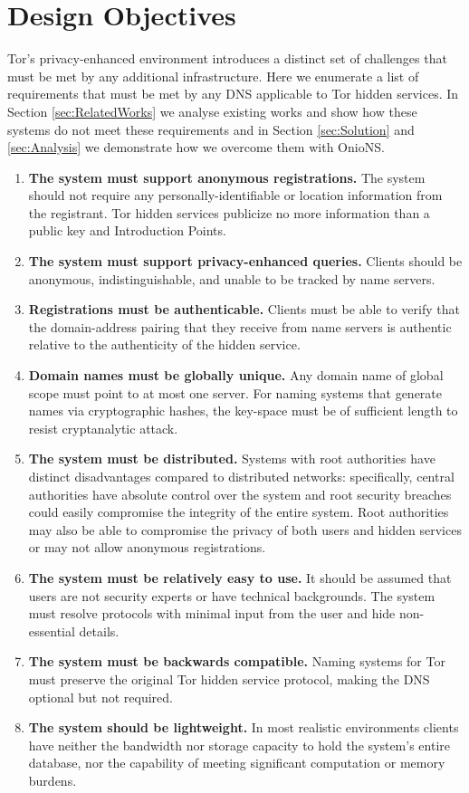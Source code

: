 \documentclass{sig-alternate}
\begin{document}
\section{Design Objectives}

Tor's privacy-enhanced environment introduces a distinct set of challenges that must be met by any additional infrastructure. Here we enumerate a list of requirements that must be met by any DNS applicable to Tor hidden services. In Section \ref{sec:RelatedWorks} we analyse existing works and show how these systems do not meet these requirements and in Section \ref{sec:Solution} and \ref{sec:Analysis} we demonstrate how we overcome them with OnioNS.

\begin{enumerate}[noitemsep]
	\item \textbf{The system must support anonymous registrations.} The system should not require any personally-identifiable or location information from the registrant. Tor hidden services publicize no more information than a public key and Introduction Points.
	\item \textbf{The system must support privacy-enhanced queries.} Clients should be anonymous, indistinguishable, and unable to be tracked by name servers.
	\item \textbf{Registrations must be authenticable.} Clients must be able to verify that the domain-address pairing that they receive from name servers is authentic relative to the authenticity of the hidden service.
	\item \textbf{Domain names must be globally unique.} Any domain name of global scope must point to at most one server. For naming systems that generate names via cryptographic hashes, the key-space must be of sufficient length to resist cryptanalytic attack.
	\item \textbf{The system must be distributed.} Systems with root authorities have distinct disadvantages compared to distributed networks: specifically, central authorities have absolute control over the system and root security breaches could easily compromise the integrity of the entire system. Root authorities may also be able to compromise the privacy of both users and hidden services or may not allow anonymous registrations.
	\item \textbf{The system must be relatively easy to use.} It should be assumed that users are not security experts or have technical backgrounds. The system must resolve protocols with minimal input from the user and hide non-essential details.
	\item \textbf{The system must be backwards compatible.} Naming systems for Tor must preserve the original Tor hidden service protocol, making the DNS optional but not required.
	\item \textbf{The system should be lightweight.} In most realistic environments clients have neither the bandwidth nor storage capacity to hold the system's entire database, nor the capability of meeting significant computation or memory burdens.
\end{enumerate}
\end{document}
